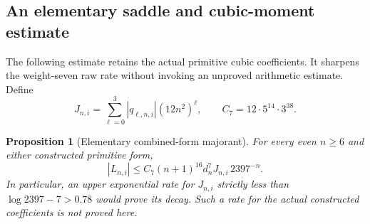 \documentclass[11pt]{article}
\newtheorem{proposition}[theorem]{Proposition}
\theoremstyle{remark}
\begin{document}
\subsection{An elementary saddle and cubic-moment estimate}
The following estimate retains the actual primitive cubic coefficients.
It sharpens the weight-seven raw rate without invoking an unproved
arithmetic estimate. Define
\[
 J_{n,i}=\sum_{\ell=0}^3|q_{\ell,n,i}|(12n^2)^\ell,
 \qquad C_7=12\cdot5^{14}\cdot3^{38}.
\]
\begin{proposition}[Elementary combined-form majorant]
\label{prop:elementary-seven}
For every even \(n\ge6\) and either constructed primitive form,
\begin{equation}
 |L_{n,i}|\le C_7(n+1)^{16}d_n^7 J_{n,i}\,2397^{-n}.
 \label{eq:elementary-seven}
\end{equation}
In particular, an upper exponential rate for \(J_{n,i}\) strictly less
than \(\log2397-7>0.78\) would prove its decay. Such a rate for the
actual constructed coefficients is not proved here.
\end{proposition}
\end{document}

